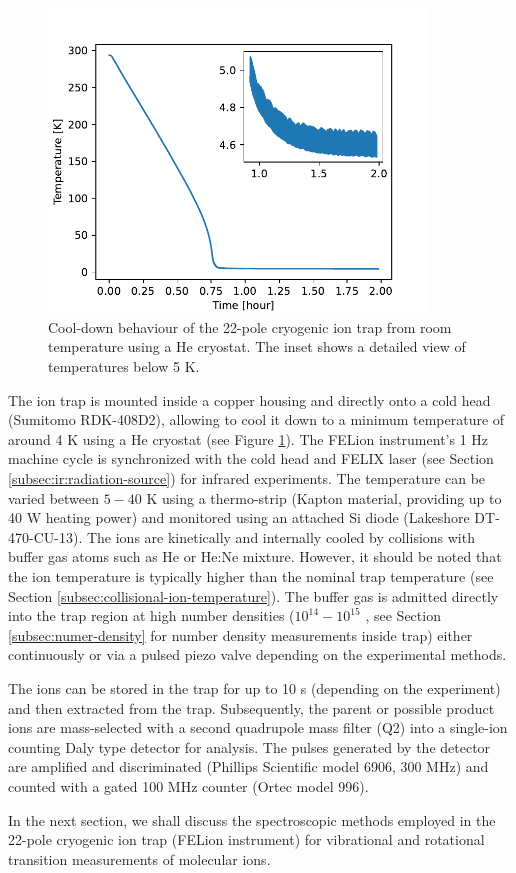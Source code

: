 \begin{figure}[!b]
    \centering
    \includegraphics[width=0.9\textwidth]{figures/Instruments/cooldown-behaviour.pdf}
    \caption{Cool-down behaviour of the 22-pole cryogenic ion trap from room temperature using a He cryostat. The inset shows a detailed view of temperatures below 5 K.}
    \label{fig:cooldown_behaviour}
\end{figure}

The ion trap is mounted inside a copper housing and directly onto a cold head (Sumitomo RDK-408D2), allowing to cool it down to a minimum temperature of around 4 K using a He cryostat (see Figure \ref{fig:cooldown_behaviour}). The FELion instrument's 1 Hz machine cycle is synchronized with the cold head and FELIX laser (see Section \ref{subsec:ir:radiation-source}) for infrared experiments. The temperature can be varied between $5-40$ K using a thermo-strip (Kapton material, providing up to 40 W heating power) and monitored using an attached Si diode (Lakeshore DT-470-CU-13). The ions are kinetically and internally cooled by collisions with buffer gas atoms such as He or He:Ne mixture. However, it should be noted that the ion temperature is typically higher than the nominal trap temperature \cite{endres_incomplete_2017} (see Section \ref{subsec:collisional-ion-temperature}). The buffer gas is admitted directly into the trap region at high number densities ($10^{14}-10^{15}$ \percc, see Section \ref{subsec:numer-density} for number density measurements inside trap) either continuously or via a pulsed piezo valve depending on the experimental methods. 

The ions can be stored in the trap for up to 10 s (depending on the experiment) and then extracted from the trap. Subsequently, the parent or possible product ions are mass-selected with a second quadrupole mass filter (Q2) into a single-ion counting Daly type detector \cite{daly_scintillation_1960} for analysis. The pulses generated by the detector are amplified and discriminated (Phillips Scientific model 6906, 300 MHz) and counted with a gated 100 MHz counter (Ortec model 996).

In the next section, we shall discuss the spectroscopic methods employed in the 22-pole cryogenic ion trap (FELion instrument) for vibrational and rotational transition measurements of molecular ions.
